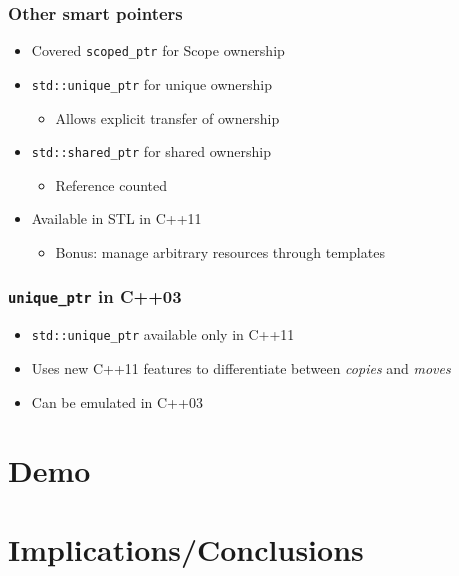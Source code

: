 \begin{frame}
    \frametitle{Other smart pointers}
    \begin{itemize}
        \item Covered \texttt{scoped\_ptr} for Scope ownership
        \item \texttt{std::unique\_ptr} for unique ownership
            \begin{itemize}
                \item Allows explicit transfer of ownership
            \end{itemize}
        \item \texttt{std::shared\_ptr} for shared ownership
            \begin{itemize}
                \item Reference counted
            \end{itemize}
        \item Available in STL in C++11
            \begin{itemize}
                \item Bonus: manage arbitrary resources through templates
            \end{itemize}
    \end{itemize}
\end{frame}

\begin{frame}
    \frametitle{\texttt{unique\_ptr} in C++03}
    \begin{itemize}
        \item \texttt{std::unique\_ptr} available only in C++11
        \item Uses new C++11 features to differentiate between \emph{copies} and \emph{moves}
        \item Can be emulated in C++03
    \end{itemize}
\end{frame}

\section{Demo}
\frame{\sectionpage}


\section{Implications/Conclusions}
\frame{\sectionpage}

